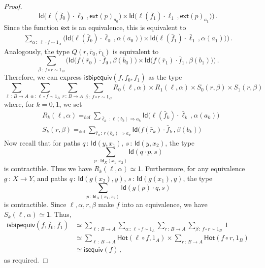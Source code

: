 \documentclass[10pt,a4paper,oneside,reqno]{amsart}
\theoremstyle{mythm}
\theoremstyle{mydef}
\theoremstyle{myrmk}
\newcommand{\defeq}{=_{\mathrm{def}}}
\newcommand{\co}{\,{:}\,}
\newcommand{\com}{\circ}
\newcommand{\ct}{\cdot}
\newcommand{\isequiv}{\mathsf{isequiv}}
\newcommand{\Hot}{\mathsf{Hot}}
\newcommand{\ext}{\mathsf{ext}}
\newcommand{\one}{\mathsf{1}}
\newcommand{\Id}{\mathsf{Id}}
\newcommand{\isbipequiv}{\mathsf{isbipequiv}}
\begin{document}
\begin{proof}
\[\Id  \big( \ell (\bar{f}_0) \ct \bar{\ell}_0 \, ,  \ext(p)_{a_0} \big) 
\times 
\Id \big( \ell(\bar{f}_1) \ct \bar{\ell}_1 \, ,  \ext(p)_{a_1} \big)
\Big) \, .
\]
Since the function $\ext$ is an equivalence, this is equivalent to
\begin{align*}
\sum_{\alpha \co \ell \com f \sim 1_A} 
\Big( \Id  \big( \ell (\bar{f}_0) \ct \bar{\ell}_0 \, ,  \alpha(a_0) \big) 
\times 
\Id \big( \ell(\bar{f}_1) \ct \bar{\ell}_1 \, ,  \alpha(a_1) \big) 
\Big) \, .
\end{align*}
Analogously, the type $Q(r,\bar{r}_0,\bar{r}_1)$ is equivalent to
\[
\sum_{\beta \co f \com r \sim 1_B}
\Big(
\Id  \big( f (\bar{r}_0) \ct \bar{f}_0 \, ,  \beta(b_0) \big) 
\times 
\Id \big( f(\bar{r}_1) \ct \bar{f}_1 \, ,  \beta(b_1) \big)
\Big) \, .
\]
Therefore, we can express $\isbipequiv(f, \bar{f}_0, \bar{f}_1)$ as the type
\[
\sum_{\ell \co B \to  A} 
\sum_{\alpha \co \ell \com f \sim 1_A}
\sum_{ r \co B \to A} 
\sum_{\beta \co f \com r \sim 1_B} 
	R_0(\ell,\alpha) \times R_1(\ell,\alpha) \times S_0(r,\beta) \times S_1(r,\beta)
\]
where, for $k = 0,1$, we set
\begin{align*}
& R_k(\ell,\alpha) \defeq \sum_{\bar{\ell}_k \co \ell(b_k) \Rightarrow a_k} \Id \big( \ell (\bar{f}_k) \ct \bar{\ell}_k \, ,  \alpha(a_k) \big) \\
& S_k(r,\beta) \defeq \sum_{\bar{r}_k \co r(b_k) \Rightarrow a_k} \Id \big( f (\bar{r}_k) \ct \bar{f}_k \, ,  \beta(b_k) \big) 
\end{align*}
Now recall  that for paths $q \co \Id(y,x_1)$, $s \co \Id(y,x_2)$, the type 
\[
\sum_{p \co \Id_X(x_1,x_2)} \Id(q \ct p,s)
\] 
is contractible. Thus we have $R_k(\ell,\alpha) \simeq \one$.
Furthermore, for any equivalence $g \co X \to Y$, and paths $q \co \Id(g(x_2),y)$, $s \co \Id(g(x_1),y)$, the type 
\[
\sum_{p \co \Id_X(x_1,x_2)} \Id(g(p) \ct q,s)
\] is contractible. Since $\ell, \alpha, r, \beta$ make $f$ into an equivalence, we have $S_k(\ell,\alpha) \simeq \one$. Thus,
\begin{align*} 
\isbipequiv(f,\bar{f}_0, \bar{f}_1) 
  & \simeq   \sum_{\ell \co B \to A} \sum_{\alpha \co \ell \com f \sim 1_A} \sum_{ r  \co B \to A} 
 \sum_{\beta \co f \com r \sim 1_B} \, 1 \\
 & \simeq \sum_{\ell \co B \to A}  \Hot( \ell \com f , 1_A ) \times 
\sum_{r  \co B \to A}  \Hot( f \com r, 1_B ) \\
 & \simeq \isequiv(f) \, ,
\end{align*} 
as required.
\end{proof}
\end{document}
